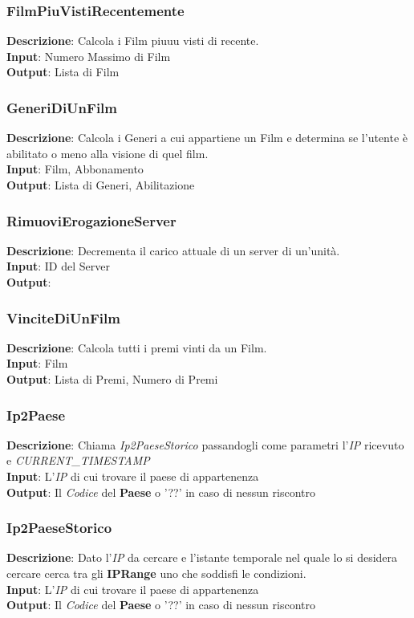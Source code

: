 \documentclass{article}
\begin{document}
\subsubsection{FilmPiuVistiRecentemente}
\textbf{Descrizione}: Calcola i Film piuuu visti di recente.\\
\textbf{Input}: Numero Massimo di Film \\
\textbf{Output}: Lista di Film \\
\subsubsection{GeneriDiUnFilm}
\textbf{Descrizione}: Calcola i Generi a cui appartiene un Film e determina se l'utente è abilitato o meno alla visione di quel film.\\
\textbf{Input}: Film, Abbonamento \\
\textbf{Output}: Lista di Generi, Abilitazione \\
\subsubsection{RimuoviErogazioneServer}
\textbf{Descrizione}: Decrementa il carico attuale di un server di un'unità.\\
\textbf{Input}: ID del Server\\
\textbf{Output}: \\
\subsubsection{VinciteDiUnFilm}
\textbf{Descrizione}: Calcola tutti i premi vinti da un Film.\\
\textbf{Input}: Film \\
\textbf{Output}: Lista di Premi, Numero di Premi \\
\subsubsection{Ip2Paese}
\textbf{Descrizione}: Chiama \textit{Ip2PaeseStorico} passandogli come parametri l'\textit{IP} ricevuto e \textit{CURRENT\_TIMESTAMP} \\
\textbf{Input}: L'\textit{IP} di cui trovare il paese di appartenenza \\
\textbf{Output}: Il \textit{Codice} del \textbf{Paese} o '??' in caso di nessun riscontro\\
\subsubsection{Ip2PaeseStorico}
\textbf{Descrizione}: Dato l'\textit{IP} da cercare e l'istante temporale nel quale lo si desidera cercare cerca tra gli \textbf{IPRange} uno che soddisfi le condizioni. \\
\textbf{Input}: L'\textit{IP} di cui trovare il paese di appartenenza \\
\textbf{Output}: Il \textit{Codice} del \textbf{Paese} o '??' in caso di nessun riscontro\\
\end{document}
